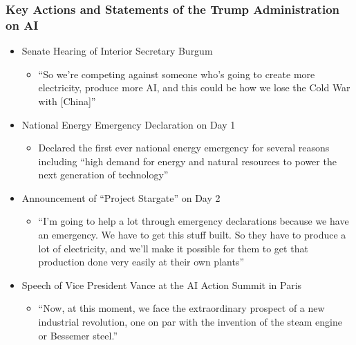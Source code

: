 \documentclass[aspectratio=169]{beamer}
\begin{document}
    \begin{frame}
        \frametitle{Key Actions and Statements of the Trump Administration on AI}
        \begin{itemize}
            \item Senate Hearing of Interior Secretary Burgum~\parencite{doug_burgum_senate_hearing_2025}
            \begin{itemize}
                \item ``So we're competing against someone who's going to create more electricity, produce more AI, and this could be how we lose the Cold War with [China]''
            \end{itemize}
            \item National Energy Emergency Declaration on Day 1~\parencite{white_house_national_energy_emergency_2025}
            \begin{itemize}
                \item Declared the first ever national energy emergency for several reasons including ``high demand for energy and natural resources to power the next generation of technology''
            \end{itemize}
            \item Announcement of ``Project Stargate'' on Day 2~\parencite{white_house_youtube_trump_infrastructure_remarks_2025}
            \begin{itemize}
                \item ``I'm going to help a lot through emergency declarations because we have an emergency.
                We have to get this stuff built.
                So they have to produce a lot of electricity, and we'll make it possible for them to get that production done very easily at their own plants''
            \end{itemize}
            \item Speech of Vice President Vance at the AI Action Summit in Paris~\parencite{ucsb_remarks_2025}
            \begin{itemize}
                \item ``Now, at this moment, we face the extraordinary prospect of a new industrial revolution, one on par with the invention of the steam engine or Bessemer steel.''
            \end{itemize}
        \end{itemize}
    \end{frame}
\end{document}

